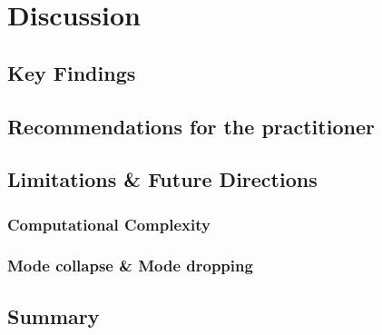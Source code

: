 \chapter{Discussion}

\section{Key Findings}

\section{Recommendations for the practitioner}\label{sec:discussion_recommendations}

\section{Limitations \& Future Directions}





\subsection{Computational Complexity}

\subsection{Mode collapse \& Mode dropping}

\section{Summary}
